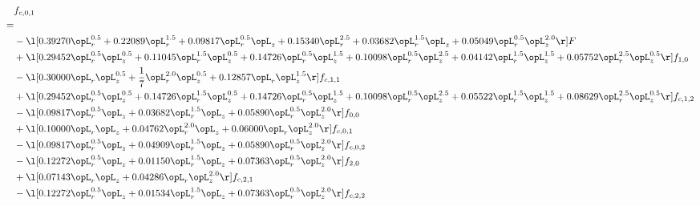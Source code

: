 \begin{alignat}{2} 
\label{eq:f_01_1} 
& f_{c,0,1} \nonumber \\ 
 = \\ 
& - \l[  0.39270 \opL_r^{0.5} +  0.22089 \opL_r^{1.5} +  0.09817 \opL_r^{0.5} \opL_z +  0.15340 \opL_r^{2.5} +  0.03682 \opL_r^{1.5} \opL_z +  0.05049 \opL_r^{0.5} \opL_z^{2.0}  \r] F \nonumber \\ 
& + \l[  0.29452 \opL_r^{0.5} \opL_z^{0.5} +  0.11045 \opL_r^{1.5} \opL_z^{0.5} +  0.14726 \opL_r^{0.5} \opL_z^{1.5} +  0.10098 \opL_r^{0.5} \opL_z^{2.5} +  0.04142 \opL_r^{1.5} \opL_z^{1.5} +  0.05752 \opL_r^{2.5} \opL_z^{0.5}  \r] f_{1,0} \nonumber \\ 
& - \l[  0.30000 \opL_r \opL_z^{0.5} + \frac{1}{7} \opL_r^{2.0} \opL_z^{0.5} +  0.12857 \opL_r \opL_z^{1.5}  \r] f_{c,1,1} \nonumber \\ 
& + \l[  0.29452 \opL_r^{0.5} \opL_z^{0.5} +  0.14726 \opL_r^{1.5} \opL_z^{0.5} +  0.14726 \opL_r^{0.5} \opL_z^{1.5} +  0.10098 \opL_r^{0.5} \opL_z^{2.5} +  0.05522 \opL_r^{1.5} \opL_z^{1.5} +  0.08629 \opL_r^{2.5} \opL_z^{0.5}  \r] f_{c,1,2} \nonumber \\ 
& - \l[  0.09817 \opL_r^{0.5} \opL_z +  0.03682 \opL_r^{1.5} \opL_z +  0.05890 \opL_r^{0.5} \opL_z^{2.0}  \r] f_{0,0} \nonumber \\ 
& + \l[  0.10000 \opL_r \opL_z +  0.04762 \opL_r^{2.0} \opL_z +  0.06000 \opL_r \opL_z^{2.0}  \r] f_{c,0,1} \nonumber \\ 
& - \l[  0.09817 \opL_r^{0.5} \opL_z +  0.04909 \opL_r^{1.5} \opL_z +  0.05890 \opL_r^{0.5} \opL_z^{2.0}  \r] f_{c,0,2} \nonumber \\ 
& - \l[  0.12272 \opL_r^{0.5} \opL_z +  0.01150 \opL_r^{1.5} \opL_z +  0.07363 \opL_r^{0.5} \opL_z^{2.0}  \r] f_{2,0} \nonumber \\ 
& + \l[  0.07143 \opL_r \opL_z +  0.04286 \opL_r \opL_z^{2.0}  \r] f_{c,2,1} \nonumber \\ 
& - \l[  0.12272 \opL_r^{0.5} \opL_z +  0.01534 \opL_r^{1.5} \opL_z +  0.07363 \opL_r^{0.5} \opL_z^{2.0}  \r] f_{c,2,2} \nonumber \\ 
\end{alignat} 


